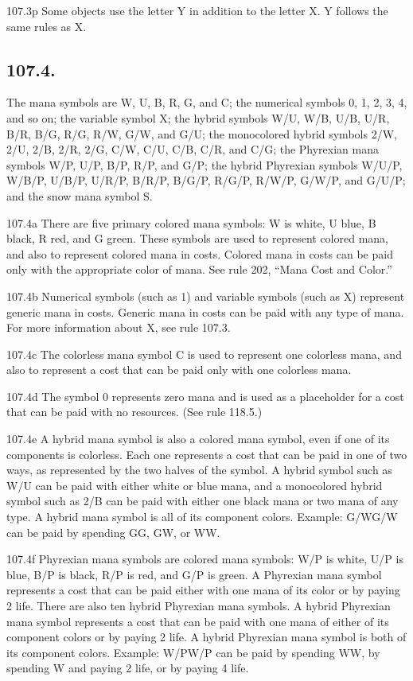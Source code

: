 107.3p Some objects use the letter Y in addition to the letter X. Y follows the same rules as X.

\subsection*{107.4.}
The mana symbols are {W}, {U}, {B}, {R}, {G}, and {C}; the numerical symbols {0}, {1}, {2}, {3}, {4}, and so on; the variable symbol {X}; the hybrid symbols {W/U}, {W/B}, {U/B}, {U/R}, {B/R}, {B/G}, {R/G}, {R/W}, {G/W}, and {G/U}; the monocolored hybrid symbols {2/W}, {2/U}, {2/B}, {2/R}, {2/G}, {C/W}, {C/U}, {C/B}, {C/R}, and {C/G}; the Phyrexian mana symbols {W/P}, {U/P}, {B/P}, {R/P}, and {G/P}; the hybrid Phyrexian symbols {W/U/P}, {W/B/P}, {U/B/P}, {U/R/P}, {B/R/P}, {B/G/P}, {R/G/P}, {R/W/P}, {G/W/P}, and {G/U/P}; and the snow mana symbol {S}.

107.4a There are five primary colored mana symbols: {W} is white, {U} blue, {B} black, {R} red, and {G} green. These symbols are used to represent colored mana, and also to represent colored mana in costs. Colored mana in costs can be paid only with the appropriate color of mana. See rule 202, “Mana Cost and Color.”

107.4b Numerical symbols (such as {1}) and variable symbols (such as {X}) represent generic mana in costs. Generic mana in costs can be paid with any type of mana. For more information about {X}, see rule 107.3.

107.4c The colorless mana symbol {C} is used to represent one colorless mana, and also to represent a cost that can be paid only with one colorless mana.

107.4d The symbol {0} represents zero mana and is used as a placeholder for a cost that can be paid with no resources. (See rule 118.5.)

107.4e A hybrid mana symbol is also a colored mana symbol, even if one of its components is colorless. Each one represents a cost that can be paid in one of two ways, as represented by the two halves of the symbol. A hybrid symbol such as {W/U} can be paid with either white or blue mana, and a monocolored hybrid symbol such as {2/B} can be paid with either one black mana or two mana of any type. A hybrid mana symbol is all of its component colors.
Example: {G/W}{G/W} can be paid by spending {G}{G}, {G}{W}, or {W}{W}.

107.4f Phyrexian mana symbols are colored mana symbols: {W/P} is white, {U/P} is blue, {B/P} is black, {R/P} is red, and {G/P} is green. A Phyrexian mana symbol represents a cost that can be paid either with one mana of its color or by paying 2 life. There are also ten hybrid Phyrexian mana symbols. A hybrid Phyrexian mana symbol represents a cost that can be paid with one mana of either of its component colors or by paying 2 life. A hybrid Phyrexian mana symbol is both of its component colors.
Example: {W/P}{W/P} can be paid by spending {W}{W}, by spending {W} and paying 2 life, or by paying 4 life.

